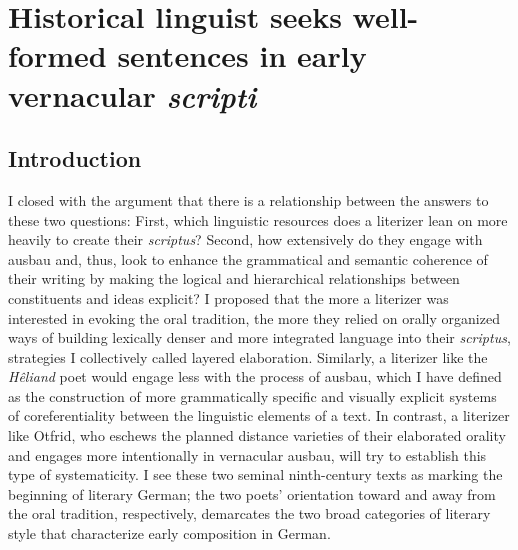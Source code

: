 \chapter{Historical linguist seeks well-formed sentences in early vernacular \textit{scripti}}\label{sec:chap:7}

\section{Introduction}
I closed  with the argument that there is a relationship between the answers to these two questions: First, which linguistic resources does a literizer lean on more heavily to create their \textit{scriptus}? Second, how extensively do they engage with ausbau and, thus, look to enhance the grammatical and semantic coherence of their writing by making the logical and hierarchical relationships between constituents and ideas explicit? I proposed that the more a literizer was interested in evoking the oral tradition, the more they relied on orally organized ways of building lexically denser and more integrated language into their \textit{scriptus}, strategies I collectively called layered elaboration. Similarly, a literizer like the \textit{Hêliand} poet would engage less with the process of ausbau, which I have defined as the construction of more grammatically specific and visually explicit systems of coreferentiality between the linguistic elements of a text. In contrast, a literizer like Otfrid, who eschews the planned distance varieties of their elaborated orality and engages more intentionally in vernacular ausbau, will try to establish this type of systematicity. I see these two seminal ninth-century texts as marking the beginning of literary German; the two poets’ orientation toward and away from the oral tradition, respectively, demarcates the two broad categories of literary style that characterize early composition in German.

